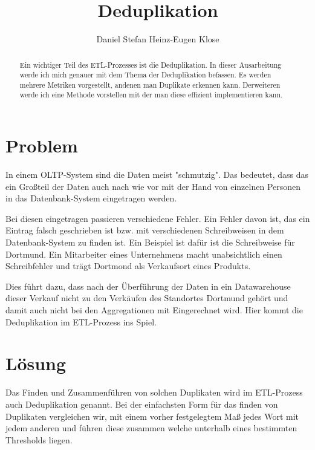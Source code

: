 \documentclass[sigconf]{acmart}
\begin{document}
\title{Deduplikation}

\author{Daniel Stefan Heinz-Eugen Klose}


\begin{abstract}
Ein wichtiger Teil des ETL-Prozesses ist die Deduplikation.
In dieser Ausarbeitung werde ich mich genauer mit dem Thema 
der Deduplikation
befassen. Es werden mehrere Metriken vorgestellt, andenen 
man Duplikate erkennen kann.
Derweiteren werde ich eine Methode vorstellen mit der man 
diese effizient implementieren kann.

\end{abstract}

\maketitle

\section*{Problem}
In einem OLTP-System sind die Daten meist "schmutzig". Das bedeutet, dass 
das ein Großteil der Daten auch nach wie vor mit der Hand von einzelnen
Personen in das Datenbank-System eingetragen werden. 

Bei diesen eingetragen
passieren verschiedene Fehler. Ein Fehler davon ist, das ein Eintrag falsch
geschrieben ist bzw. mit verschiedenen Schreibweisen in dem Datenbank-System
zu finden ist. Ein Beispiel ist dafür ist die Schreibweise für Dortmund.
Ein Mitarbeiter eines Unternehmens macht unabsichtlich einen 
Schreibfehler und trägt Dortmond als Verkaufsort eines Produkts.

Dies führt dazu, dass nach der Überführung der Daten in ein 
Datawarehouse dieser Verkauf nicht zu den Verkäufen des Standortes Dortmund
gehört und damit auch nicht bei den Aggregationen mit Eingerechnet wird.
Hier kommt die Deduplikation im ETL-Prozess ins Spiel.

\section*{Lösung}
Das Finden und Zusammenführen von solchen Duplikaten wird im ETL-Prozess 
auch Deduplikation genannt. Bei der einfachsten Form für das finden von
Duplikaten vergleichen wir, mit einem vorher festgelegtem Maß jedes Wort 
mit jedem anderen und führen diese zusammen welche unterhalb eines 
bestimmten Thresholds liegen.
\end{document}
